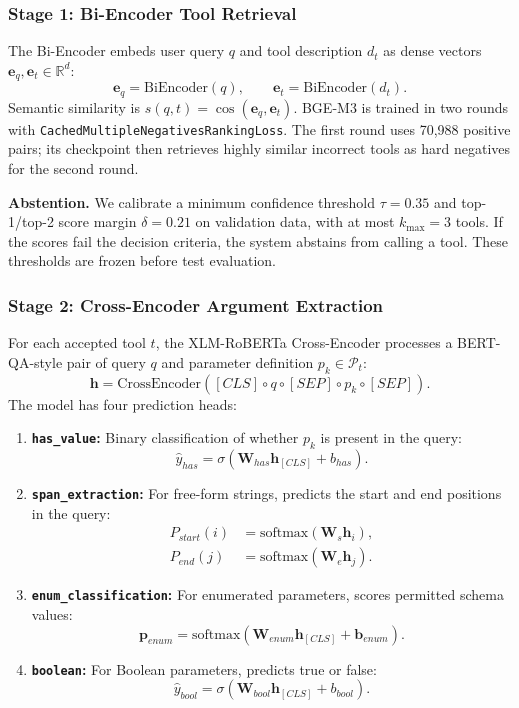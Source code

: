 \documentclass[10pt,twocolumn,a4paper]{article}
\begin{document}
\subsubsection{Stage 1: Bi-Encoder Tool Retrieval}
The Bi-Encoder embeds user query $q$ and tool description $d_t$ as dense vectors $\mathbf{e}_q,\mathbf{e}_t\in\mathbb{R}^{d}$:
\[
\mathbf{e}_q=\text{BiEncoder}(q),\qquad\mathbf{e}_t=\text{BiEncoder}(d_t).
\]
Semantic similarity is $s(q,t)=\cos(\mathbf{e}_q,\mathbf{e}_t)$. BGE-M3 is trained in two rounds with \texttt{CachedMultipleNegativesRankingLoss}. The first round uses 70,988 positive pairs; its checkpoint then retrieves highly similar incorrect tools as hard negatives for the second round.

\textbf{Abstention.} We calibrate a minimum confidence threshold $\tau=0.35$ and top-1/top-2 score margin $\delta=0.21$ on validation data, with at most $k_{\max}=3$ tools. If the scores fail the decision criteria, the system abstains from calling a tool. These thresholds are frozen before test evaluation.

\subsubsection{Stage 2: Cross-Encoder Argument Extraction}
For each accepted tool $t$, the XLM-RoBERTa Cross-Encoder processes a BERT-QA-style pair of query $q$ and parameter definition $p_k\in\mathcal{P}_t$:
\[
\mathbf{h}=\text{CrossEncoder}([CLS]\circ q\circ[SEP]\circ p_k\circ[SEP]).
\]
The model has four prediction heads:
\begin{enumerate}
    \item \textbf{\texttt{has\_value}:} Binary classification of whether $p_k$ is present in the query:
    \[\hat{y}_{has}=\sigma(\mathbf{W}_{has}\mathbf{h}_{[CLS]}+b_{has}).\]
    \item \textbf{\texttt{span\_extraction}:} For free-form strings, predicts the start and end positions in the query:
    \begin{align*}P_{start}(i)&=\text{softmax}(\mathbf{W}_s\mathbf{h}_i),\\P_{end}(j)&=\text{softmax}(\mathbf{W}_e\mathbf{h}_j).\end{align*}
    \item \textbf{\texttt{enum\_classification}:} For enumerated parameters, scores permitted schema values:
    \[\mathbf{p}_{enum}=\text{softmax}(\mathbf{W}_{enum}\mathbf{h}_{[CLS]}+\mathbf{b}_{enum}).\]
    \item \textbf{\texttt{boolean}:} For Boolean parameters, predicts true or false:
    \[\hat{y}_{bool}=\sigma(\mathbf{W}_{bool}\mathbf{h}_{[CLS]}+b_{bool}).\]
\end{enumerate}
\end{document}

